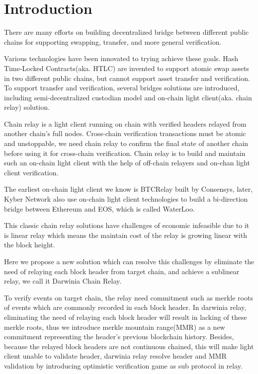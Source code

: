 \section{Introduction}
There are many efforts on building decentralized bridge between different public chains for supporting swapping, transfer, and more general verification.

Various technologies have been innovated to trying achieve these goals. Hash Time-Locked Contracts(aka. HTLC) are invented to support atomic swap assets in two different public chains, but cannot support asset transfer and verification. To support transfer and verification, several bridges solutions are introduced, including semi-decentralized custodian model and on-chain light client(aka. chain relay) solution.

Chain relay is a light client running on chain with verified headers relayed from another chain's full nodes. Cross-chain verification transactions must be atomic and unstoppable, we need chain relay to confirm the final state of another chain before using it for cross-chain verification. Chain relay is to build and maintain such an on-chain light client with the help of off-chain relayers and on-chan light client verification.

The earliest on-chain light client we know is BTCRelay built by Consensys, later, Kyber Network also use on-chain light client technologies to build a bi-direction bridge between Ethereum and EOS, which is called WaterLoo.

This classic chain relay solutions have challenges of economic infeasible due to it is linear relay which means the maintain cost of the relay is growing linear with the block height.

Here we propose a new solution which can resolve this challenges by eliminate the need of relaying each block header from target chain, and achieve a sublinear relay, we call it Darwinia Chain Relay.

To verify events on target chain, the relay need commitment such as merkle roots of events which are commonly recorded in each block header. In darwinia relay, eliminating the need of relaying each block header will result in lacking of these merkle roots, thus we introduce merkle mountain range(MMR) as a new commitment representing the header's previous blockchain history. Besides, because the relayed block headers are not continuous chained, this will make light client unable to validate header, darwinia relay resolve header and MMR validation by introducing optimistic verification game as sub protocol in relay.

